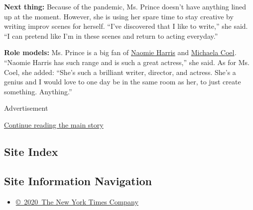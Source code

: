 \textbf{Next thing:} Because of the pandemic, Ms. Prince doesn't have
anything lined up at the moment. However, she is using her spare time to
stay creative by writing improv scenes for herself. ``I've discovered
that I like to write,'' she said. ``I can pretend like I'm in these
scenes and return to acting everyday.''

\textbf{Role models:} Ms. Prince is a big fan of
\href{https://www.nytimes3xbfgragh.onion/2019/10/25/movies/naomie-harris-black-blue.html}{Naomie
Harris} and
\href{https://www.nytimes3xbfgragh.onion/2020/07/20/arts/television/i-may-destroy-you-influences.html}{Michaela
Coel}\emph{.} ``Naomie Harris has such range and is such a great
actress,'' she said. As for Ms. Coel, she added: ``She's such a
brilliant writer, director, and actress. She's a genius and I would love
to one day be in the same room as her, to just create something.
Anything.''

Advertisement

\protect\hyperlink{after-bottom}{Continue reading the main story}

\hypertarget{site-index}{%
\subsection{Site Index}\label{site-index}}

\hypertarget{site-information-navigation}{%
\subsection{Site Information
Navigation}\label{site-information-navigation}}

\begin{itemize}
\tightlist
\item
  \href{https://help.nytimes3xbfgragh.onion/hc/en-us/articles/115014792127-Copyright-notice}{©~2020~The
  New York Times Company}
\end{itemize}

